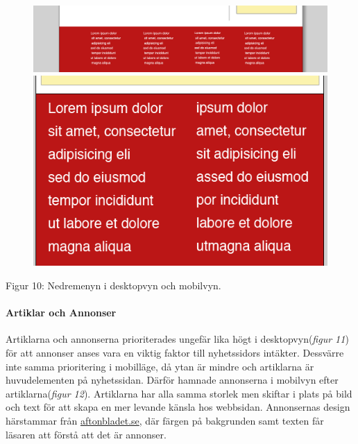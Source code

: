 \documentclass[11pt]{article}
\begin{document}
\begin{figure}[H]
\centerline{%
\includegraphics[scale=0.237]{pics/menydesktopbot.png}\hspace{2em}%
\includegraphics[scale=0.35]{pics/menymobilbot.png}%
}
\end{figure}
\hspace{0.5cm}Figur 10: Nedremenyn i desktopvyn och mobilvyn.
\newpage
\paragraph{Artiklar och Annonser}\mbox{}

Artiklarna och annonserna prioriterades ungefär lika högt i desktopvyn(\textit{figur 11}) för att annonser anses vara en viktig faktor till nyhetssidors intäkter. Dessvärre inte samma prioritering i mobilläge, då ytan är mindre och artiklarna är huvudelementen på nyhetssidan. Därför hamnade annonserna i mobilvyn efter artiklarna(\textit{figur 12}). Artiklarna har alla samma storlek men skiftar i plats på bild och text för att skapa en mer levande känsla hos webbsidan. Annonsernas design härstammar från \href{www.aftonbladet.se}{aftonbladet.se}, där färgen på bakgrunden samt texten får läsaren att förstå att det är annonser. 
\\
\end{document}
